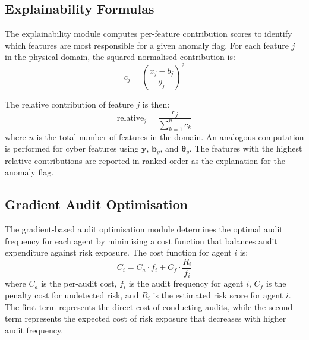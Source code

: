 \subsection{Explainability Formulas}
\label{sec:xai_formulas}

The explainability module computes per-feature contribution scores to identify which features are most responsible for a given anomaly flag. For each feature $j$ in the physical domain, the squared normalised contribution is:
\begin{equation}
c_j = \left( \frac{x_j - b_j}{\theta_j} \right)^2
\label{eq:cj}
\end{equation}

\par \vspace{0.25cm}
\noindent
The relative contribution of feature $j$ is then:
\begin{equation}
\text{relative}_j = \frac{c_j}{\displaystyle\sum_{k=1}^{n} c_k}
\label{eq:rel}
\end{equation}
where $n$ is the total number of features in the domain. An analogous computation is performed for cyber features using $\mathbf{y}$, $\mathbf{b}_y$, and $\boldsymbol{\theta}_y$. The features with the highest relative contributions are reported in ranked order as the explanation for the anomaly flag.

\subsection{Gradient Audit Optimisation}
\label{sec:gradient_audit}

The gradient-based audit optimisation module determines the optimal audit frequency for each agent by minimising a cost function that balances audit expenditure against risk exposure. The cost function for agent $i$ is:
\begin{equation}
C_i = C_a \cdot f_i + C_f \cdot \frac{R_i}{f_i}
\label{eq:ci}
\end{equation}
where $C_a$ is the per-audit cost, $f_i$ is the audit frequency for agent $i$, $C_f$ is the penalty cost for undetected risk, and $R_i$ is the estimated risk score for agent $i$. The first term represents the direct cost of conducting audits, while the second term represents the expected cost of risk exposure that decreases with higher audit frequency.

